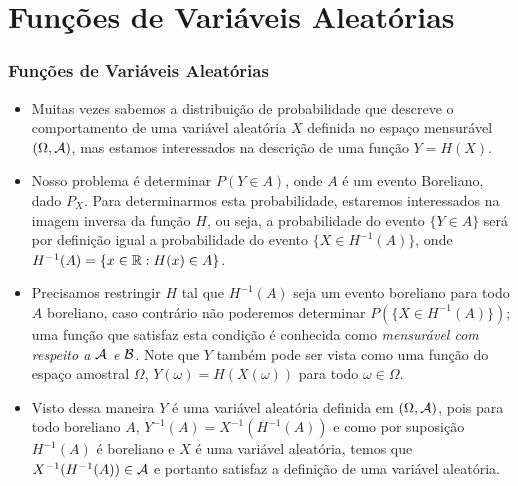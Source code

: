 \section{Funções de Variáveis Aleatórias}
\begin{frame}
\frametitle{\textbf{Funções de Variáveis Aleatórias}}
\baselineskip=13pt
\begin{block}{}
\begin{itemize}
\item Muitas vezes sabemos a distribuição de probabilidade que descreve o
comportamento de uma variável aleatória $X$ definida no espaço
mensurável $(\Omega,{\cal A})$, mas estamos interessados na descrição de
uma função $Y=H(X)$.

\item Nosso problema é determinar $P(Y\in A)$, onde $A$ é um evento Boreliano,
dado $P_X$. Para determinarmos esta probabilidade, estaremos
interessados na imagem inversa da função $H$, ou seja, a
probabilidade do evento $\{Y\in A\}$ será por definição igual a
probabilidade do evento $\{X\in H^{-1}(A)\}$, onde
$H^{-1}(A)=\{x\in\mathbb{R}:H(x)\in A\}$. 

\item Precisamos restringir $H$ tal que $H^{-1}(A)$
seja um evento boreliano para todo $A$ boreliano, caso contrário não
poderemos determinar $P(\{X\in H^{-1}(A)\})$; uma função que satisfaz esta
condição é conhecida como {\em mensurável com respeito a ${\cal A}$ e ${\cal B}$}. Note que $Y$ também
pode ser vista como uma função do espaço amostral $\Omega$,
$Y(\omega)=H(X(\omega))$ para todo $\omega\in\Omega$. 

\item Visto dessa
maneira $Y$ é uma variável aleatória definida em $(\Omega,{\cal A})$, pois
para todo boreliano $A$, $Y^{-1}(A)=X^{-1}(H^{-1}(A))$ e como por
suposição $H^{-1}(A)$ é boreliano e $X$ é uma variável aleatória,
temos que $X^{-1}(H^{-1}(A))\in {\cal A}$ e portanto satisfaz a definição
de uma variável aleatória.
\end{itemize}
\end{block}
\end{frame}

